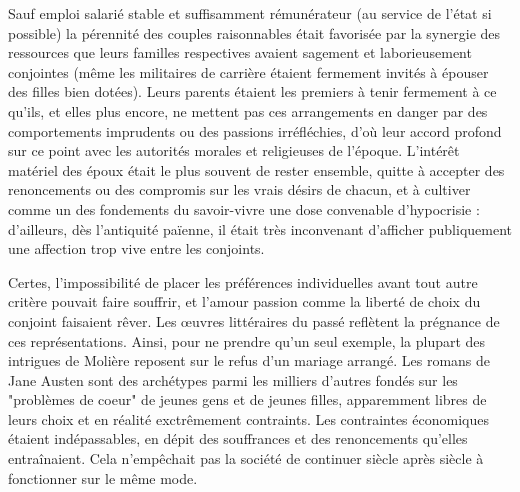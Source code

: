  Sauf emploi salarié stable et suffisamment rémunérateur (au service de l'état si possible) la pérennité des couples raisonnables était favorisée par la synergie des ressources que leurs familles respectives avaient sagement et laborieusement conjointes (même les militaires de carrière étaient fermement invités à épouser des filles bien dotées). Leurs parents étaient les premiers à tenir fermement à ce qu'ils, et elles plus encore, ne mettent pas ces arrangements en danger par des comportements imprudents ou des passions irréfléchies, d'où leur accord profond sur ce point avec les autorités morales et religieuses de l'époque. L'intérêt matériel des époux était le plus souvent de rester ensemble, quitte à accepter des renoncements ou des compromis sur les vrais désirs de chacun, et à cultiver comme un des fondements du savoir-vivre une dose convenable d'hypocrisie : d'ailleurs, dès l'antiquité païenne, il était très inconvenant d'afficher publiquement une affection trop vive entre les conjoints. 

 Certes, l'impossibilité de placer les préférences individuelles avant tout autre critère pouvait faire souffrir, et l'amour passion comme la liberté de choix du conjoint faisaient rêver. Les œuvres littéraires du passé reflètent la prégnance de ces représentations. Ainsi, pour ne prendre qu'un seul exemple, la plupart des intrigues de Molière reposent sur le refus d'un mariage arrangé. Les romans de Jane Austen sont des archétypes parmi les milliers d'autres fondés sur les "problèmes de coeur" de jeunes gens et de jeunes filles, apparemment libres de leurs choix et en réalité exctrêmement contraints. Les contraintes économiques étaient indépassables, en dépit des souffrances et des renoncements qu'elles entraînaient. Cela n'empêchait pas la société de continuer siècle après siècle à fonctionner sur le même mode. 
 